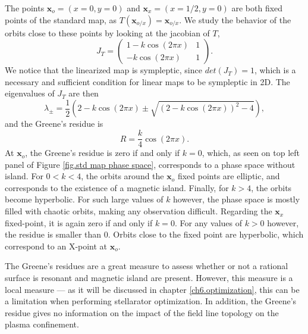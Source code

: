 \documentclass[my_thesis.tex]{subfiles}
\begin{document}
The points $\mathbf{x}_o=(x=0,y=0)$ and $\mathbf{x}_x=(x=1/2,y=0)$ are both fixed points of the standard map, as $T(\mathbf{x}_{o/x})=\mathbf{x}_{o/x}$. We study the behavior of the orbits close to these points by looking at the jacobian of $T$,
\begin{equation}
	J_T = \begin{pmatrix}
		1-k\cos(2\pi x) & 1 \\
		-k\cos(2\pi x) & 1
	\end{pmatrix}.
\end{equation}
We notice that the linearized map is sympleptic, since $det(J_T)=1$, which is a necessary and sufficient condition for linear maps to be sympleptic in 2D. The eigenvalues of $J_T$ are then
\begin{equation}
	\lambda_\pm = \frac{1}{2}\left(2-k\cos(2\pi x) \pm \sqrt{(2-k\cos(2\pi x))^2-4}\right),
\end{equation}
and the Greene's residue is
\begin{equation}
	R = \frac{k}{4}\cos(2\pi x).
\end{equation}
At $\mathbf{x}_o$, the Greene's residue is zero if and only if $k=0$, which, as seen on top left panel of Figure \ref{fig.std map phase space}, corresponds to a phase space without island. For $0<k<4$, the orbits around the $\mathbf{x}_o$ fixed points are elliptic, and corresponds to the existence of a magnetic island. Finally, for $k>4$, the orbits become hyperbolic. For such large values of $k$ however, the phase space is mostly filled with chaotic orbits, making any observation difficult. Regarding the $\mathbf{x}_x$ fixed-point, it is again zero if and only if $k=0$. For any values of $k>0$ however, the residue is smaller than $0$. Orbits close to the fixed point are hyperbolic, which correspond to an X-point at $\mathbf{x}_o$.


The Greene's residues are a great measure to assess whether or not a rational surface is resonant and magnetic island are present. However, this measure is a local measure --- as it will be discussed in chapter \ref{ch6.optimization}, this can be a limitation when performing stellarator optimization. In addition, the Greene's residue gives no information on the impact of the field line topology on the plasma confinement.
\end{document}
